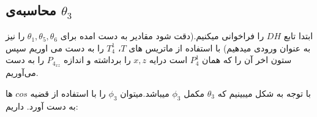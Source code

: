 \documentclass{article}
\begin{document}
\subsection{محاسبه‌ی $\theta_3$}
ابتدا تابع $DH$ را فراخوانی میکنیم.(دقت شود مقادیر به دست امده برای $\theta_1, \theta_5, \theta_6$ را نیز به عنوان ورودی میدهیم)
با استفاده از ماتریس های $T$، $T_4^1$ را به دست می اوریم سپس ستون اخر آن را که همان $P_4^1$ است درایه $x, z$ را برداشته و اندازه $P_{4_{xz}}$ را به دست  می‌آوریم.
\begin{figure}[H]%
	\centering
    \caption{\label{fig:formula216}}
\end{figure}
\noindent
با توجه به شکل میبینیم که $\theta_3$  مکمل $\phi_3$ میباشد.میتوان $\phi_3$ را با استفاده از قضیه $cos$ ها به دست آورد. داریم:
\begin{figure}[H]%
	\centering
    \qquad
    \qquad
    \caption{\label{fig:formula220}}
\end{figure}
\end{document}
